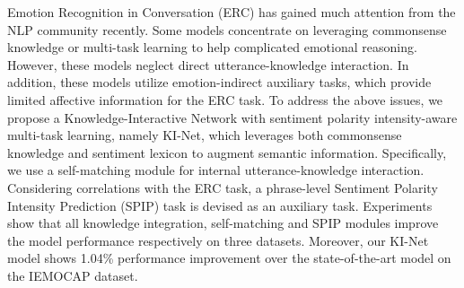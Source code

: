 Emotion Recognition in Conversation (ERC) has gained much attention from the NLP community recently. Some models concentrate on leveraging commonsense knowledge or multi-task learning to help complicated emotional reasoning. However, these models neglect direct utterance-knowledge interaction. In addition, these models utilize emotion-indirect auxiliary tasks, which provide limited affective information for the ERC task. To address the above issues, we propose a Knowledge-Interactive Network with sentiment polarity intensity-aware multi-task learning, namely KI-Net, which leverages both commonsense knowledge and sentiment lexicon to augment semantic information. Specifically, we use a self-matching module for internal utterance-knowledge interaction. Considering correlations with the ERC task, a phrase-level Sentiment Polarity Intensity Prediction (SPIP) task is devised as an auxiliary task. Experiments show that all knowledge integration, self-matching and SPIP modules improve the model performance respectively on three datasets. Moreover, our KI-Net model shows 1.04\% performance improvement over the state-of-the-art model on the IEMOCAP dataset.
